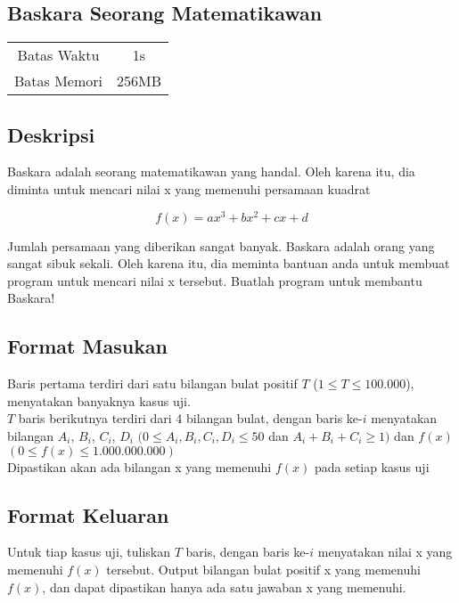 \documentclass{article}
\begin{document}
\begin{center}

    
    \section*{Baskara Seorang Matematikawan} %

    \begin{tabular}{ | c c | }
        \hline
        Batas Waktu  & 1s \\    %
        Batas Memori & 256MB \\  %
        \hline
    \end{tabular}
\end{center}

\subsection*{Deskripsi}

Baskara adalah seorang matematikawan yang handal. Oleh karena itu, dia diminta untuk mencari nilai x yang memenuhi persamaan kuadrat 

\[ f(x) = ax^3 + bx^2 + cx + d \]

Jumlah persamaan yang diberikan sangat banyak. Baskara adalah orang yang sangat sibuk sekali. Oleh karena itu, dia meminta bantuan anda untuk membuat program untuk mencari nilai x tersebut. Buatlah program untuk membantu Baskara!

\subsection*{Format Masukan}

Baris pertama terdiri dari satu bilangan bulat positif $T$ ($1 \leq T \leq 100.000$), menyatakan banyaknya kasus uji. \\
$T$ baris berikutnya terdiri dari 4 bilangan bulat, dengan baris ke-$i$ menyatakan bilangan $A_i$, $B_i$, $C_i$, $D_i$  $(0 \leq A_i,B_i,C_i,D_i \leq 50 $ dan $ A_i + B_i + C_i \geq 1)$  dan $f(x)$ $(0 \leq f(x) \leq 1.000.000.000 )$\\
Dipastikan akan ada bilangan x yang memenuhi $f(x)$ pada setiap kasus uji

\subsection*{Format Keluaran}

Untuk tiap kasus uji, tuliskan $T$ baris, dengan baris ke-$i$ menyatakan nilai x yang memenuhi $f(x)$ tersebut.
Output bilangan bulat positif x yang memenuhi $f(x)$, dan dapat dipastikan hanya ada satu jawaban x yang memenuhi.  
\\
\end{document}
